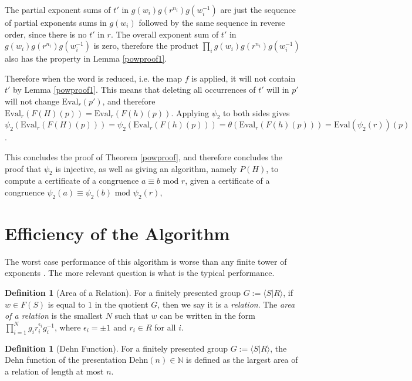 \documentclass[12pt]{article} %
\theoremstyle{definition}
\theoremstyle{definition}
\theoremstyle{definition}
\theoremstyle{definition}
\theoremstyle{definition}
\newtheorem{defn}[theorem]{Definition}
\theoremstyle{definition}
\begin{document}
The partial exponent sums of $t'$ in $g(w_i)g(r^{n_i})g(w_i^{-1})$ are just
the sequence of partial exponents sums in $g(w_i)$ followed by the same sequence in reverse
order, since there is no $t'$ in $r$. The overall exponent sum
of $t'$ in $g(w_i)g(r^{n_i})g(w_i^{-1})$ is zero, therefore the product
$\prod_i g(w_i)g(r^{n_i})g(w_i^{-1})$ also has the property in Lemma \ref{powproof1}.

Therefore when the word is reduced, i.e. the map $f$ is applied,
it will not contain $t'$ by Lemma \ref{powproof1}. This means that deleting all occurrences of
$t'$ will in $p'$ will not change $\text{Eval}_r(p')$, and therefore
$\text{Eval}_r(F(H)(p)) = \text{Eval}_r(F(h)(p))$.
Applying $\psi_2$ to both sides gives
$\psi_2(\text{Eval}_r(F(H)(p))) =
  \psi_2(\text{Eval}_r(F(h)(p))) =
  \theta(\text{Eval}_r(F(h)(p))) =
  \text{Eval}(\psi_2(r))(p)$.

  This concludes the proof of Theorem \ref{powproof}, and therefore concludes the proof
  that $\psi_2$ is injective, as well as giving an algorithm, namely $P(H)$,
  to compute a certificate of a congruence $a \equiv b \text{ mod } r$,
  given a certificate of a congruence  $\psi_2(a) \equiv \psi_2(b) \text{ mod } \psi_2(r)$,

\section{Efficiency of the Algorithm}

  The worst case performance of this algorithm is worse than any finite tower of exponents
  \cite{miasnikov2011word}. The more relevant question is what is the typical performance.

  \begin{defn}[Area of a Relation]
  For a finitely presented group $G := \langle S | R\rangle$, if $w \in F(S)$ is equal
  to $1$ in the quotient $G$, then we say it is a \textit{relation}.
  The \textit{area of a relation} is the smallest $N$ such that $w$ can be written
  in the form $\prod_{i=1}^N g_i r_i^{\epsilon_i} g_i^{-1}$, where $\epsilon_i = \pm 1$
  and $r_i \in R$ for all $i$.
  \end{defn}

  \begin{defn}[Dehn Function]
  For a finitely presented group $G := \langle S | R\rangle$, the Dehn function
  of the presentation $\text{Dehn}(n) \in \mathbb{N}$ is defined as the
  largest area of a relation of length at most $n$.
  \end{defn}
\end{document}
